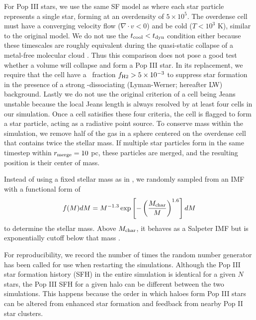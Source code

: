 \documentclass[useAMS,usenatbib]{mn2e}
\begin{document}
For Pop III stars, we use the same SF model as \citet{Wise08_Gal}
where each star particle represents a single star, forming at an
overdensity of $5 \times 10^5$.  The overdense cell must have a
converging velocity flow ($\nabla \cdot v < 0$) and be cold ($T <
10^3$ K), similar to the original \citet{Cen92} model.  We do not use
the $t_{\rm cool} < t_{\rm dyn}$ condition either because these
timescales are roughly equivalent during the quasi-static collapse of
a metal-free molecular cloud \citep[e.g.][]{OShea07a}.  Thus this
comparison does not pose a good test whether a volume will collapse
and form a Pop III star.  In its replacement, we require that the cell
have a \hh~fraction $f_{\rm H2} > 5 \times 10^{-3}$ to suppress star
formation in the presence of a strong \hh-dissociating (Lyman-Werner;
hereafter LW) background.  Lastly we do not use the original criterion
of a cell being Jeans unstable because the local Jeans length is
always resolved by at least four cells in our simulation.  Once a cell
satisifies these four criteria, the cell is flagged to form a star
particle, acting as a radiative point source.  To conserve mass within
the simulation, we remove half of the gas in a sphere centered on the
overdense cell that contains twice the stellar mass.  If multiple star
particles form in the same timestep within $r_{\rm merge} = 10$ pc,
these particles are merged, and the resulting position is their center
of mass.

Instead of using a fixed stellar mass as in \citet{Wise08_Gal}, we
randomly sampled from an IMF with a functional form of
%
\begin{equation}
\label{eqn:imf}
f(M)dM = M^{-1.3} \exp\left[-\left(\frac{M_{\rm
        char}}{M}\right)^{1.6}\right] dM
\end{equation}
to determine the stellar mass.  Above $M_{\rm char}$, it behaves as a
Salpeter IMF but is exponentially cutoff below that mass
\citep{Chabrier03, Clark09}.

For reproducibility, we record the number of times the random number
generator \citep[Mersenne twister;][]{MTwister} has been called for use
when restarting the simulations.  Although the Pop III star formation
history (SFH) in the entire simulation is identical for a given $N$
stars, the Pop III SFH for a given halo can be different between the
two simulations.  This happens because the order in which haloes form
Pop III stars can be altered from enhanced star formation and feedback
from nearby Pop II star clusters.
\end{document}

